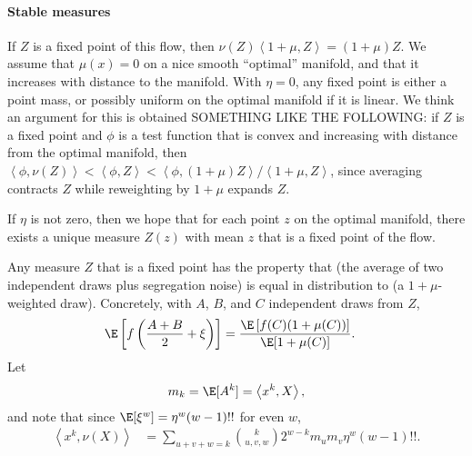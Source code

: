 \documentclass{article}
\newcommand{\ip}[2]{\left\langle #1, #2 \right\rangle}
\begin{document}
\paragraph{Stable measures}
If $Z$ is a fixed point of this flow,
then $\nu(Z)\ip{1+\mu}{Z} = (1+\mu)Z$.
We assume that $\mu(x) = 0$ on a nice smooth ``optimal'' manifold,
and that it increases with distance to the manifold.
With $\eta = 0$,
any fixed point is either a point mass,
or possibly uniform on the optimal manifold if it is linear.
We think an argument for this is obtained SOMETHING LIKE THE FOLLOWING: 
if $Z$ is a fixed point
and $\phi$ is a test function that is convex and increasing with distance from the optimal manifold,
then $\ip{\phi}{\nu(Z)} < \ip{\phi}{Z} < \ip{\phi}{(1+\mu)Z}/\ip{1+\mu}{Z}$,
since averaging contracts $Z$ while reweighting by $1+\mu$ expands $Z$.

If $\eta$ is not zero, then we hope that for each point $z$ on the optimal manifold,
there exists a unique measure $Z(z)$ with mean $z$ that is a fixed point
of the flow.

Any measure $Z$ that is a fixed point has the property that
(the average of two independent draws plus segregation noise)
is equal in distribution to
(a $1+\mu$-weighted draw).
Concretely, with $A$, $B$, and $C$ independent draws from $Z$,
$$\begin{aligned}
    \E\left[ f\left( \frac{A+B}{2} + \xi \right) \right]
    &=
    \frac{\E\left[ f(C) (1+\mu(C)) \right]}{\E[1+\mu(C)]} .
\end{aligned}$$
Let
$$\begin{aligned}
    m_k = \E[A^k] = \ip{x^k}{X} ,
\end{aligned}$$
and note that since $\E[\xi^w] = \eta^w (w-1)!!$ for even $w$,
$$\begin{aligned}
    \ip{x^k}{\nu(X)}
    &=
    \sum_{u+v+w=k} \binom{k}{u,v,w} 2^{w-k} m_u m_v \eta^w (w-1)!!.
\end{aligned}$$
\end{document}
